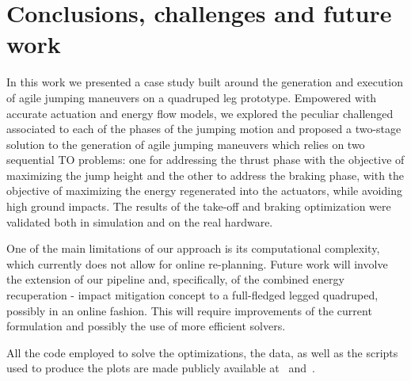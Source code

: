 \section{Conclusions, challenges and future work}\label{sec:conclusions}
In this work we presented a case study built around the generation and execution of agile jumping maneuvers on a quadruped leg prototype.  
Empowered with accurate actuation and energy flow models, we explored the peculiar challenged associated to each of the phases of the jumping motion and proposed a two-stage solution to the generation of agile jumping maneuvers which relies on two sequential TO problems: one for addressing the thrust phase with the objective of maximizing the jump height and the other to address the braking phase, with the objective of maximizing the energy regenerated into the actuators, while avoiding high ground impacts. The results of the take-off and braking optimization were validated both in simulation and on the real hardware. 

One of the main limitations of our approach is its computational complexity, which currently does not allow for online re-planning. Future work will involve the extension of our pipeline and, specifically, of the combined energy recuperation - impact mitigation concept to a full-fledged legged quadruped, possibly in an online fashion. This will require improvements of the current formulation and possibly the use of more efficient solvers.  

All the code employed to solve the optimizations, the  data, as well as the scripts used to produce the plots are made publicly available at~\cite{url::awesome_leg_repo} and~\cite{url::data_link}.
